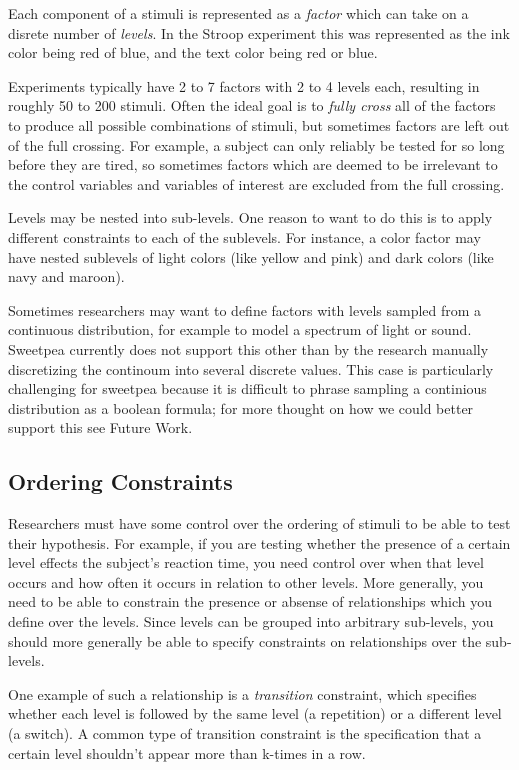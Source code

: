 Each component of a stimuli is represented as a \emph{factor} which can take on a disrete number of \emph{levels}. In the Stroop experiment this was represented as the ink color being red of blue, and the text color being red or blue.

Experiments typically have 2 to 7 factors with 2 to 4 levels each, resulting in roughly 50 to 200 stimuli. Often the ideal goal is to \emph{fully cross} all of the factors to produce all possible combinations of stimuli, but sometimes factors are left out of the full crossing. For example, a subject can only reliably be tested for so long before they are tired, so sometimes factors which are deemed to be irrelevant to the control variables and variables of interest are excluded from the full crossing.

Levels may be nested into sub-levels. One reason to want to do this is to apply different constraints to each of the sublevels. For instance, a color factor may have nested sublevels of light colors (like yellow and pink) and dark colors (like navy and maroon).

Sometimes researchers may want to define factors with levels sampled from a continuous distribution, for example to model a spectrum of light or sound. Sweetpea currently does not support this other than by the research manually discretizing the continoum into several discrete values. This case is particularly challenging for sweetpea because it is difficult to phrase sampling a continious distribution as a boolean formula; for more thought on how we could better support this see Future Work.

\subsection{Ordering Constraints}

Researchers must have some control over the ordering of stimuli to be able to test their hypothesis. For example, if you are testing whether the presence of a certain level effects the subject's reaction time, you need control over when that level occurs and how often it occurs in relation to other levels. More generally, you need to be able to constrain the presence or absense of relationships which you define over the levels. Since levels can be grouped into arbitrary sub-levels, you should more generally be able to specify constraints on relationships over the sub-levels.

One example of such a relationship is a \emph{transition} constraint, which specifies whether each level is followed by the same level (a repetition) or a different level (a switch). A common type of transition constraint is the specification that a certain level shouldn't appear more than k-times in a row.

